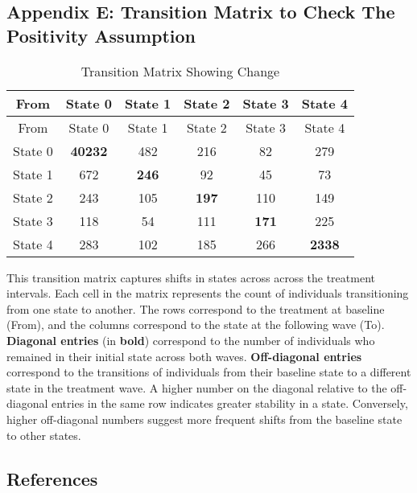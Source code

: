 \documentclass[
  single column]{article}
\begin{document}
\newpage{}

\subsection{Appendix E: Transition Matrix to Check The Positivity
Assumption}\label{appendix-transition}

\begin{longtable}[]{@{}cccccc@{}}
\caption{Transition Matrix Showing
Change}\label{tbl-transition}\tabularnewline
\toprule\noalign{}
From & State 0 & State 1 & State 2 & State 3 & State 4 \\
\midrule\noalign{}
\endfirsthead
\toprule\noalign{}
From & State 0 & State 1 & State 2 & State 3 & State 4 \\
\midrule\noalign{}
\endhead
\bottomrule\noalign{}
\endlastfoot
State 0 & \textbf{40232} & 482 & 216 & 82 & 279 \\
State 1 & 672 & \textbf{246} & 92 & 45 & 73 \\
State 2 & 243 & 105 & \textbf{197} & 110 & 149 \\
State 3 & 118 & 54 & 111 & \textbf{171} & 225 \\
State 4 & 283 & 102 & 185 & 266 & \textbf{2338} \\
\end{longtable}

This transition matrix captures shifts in states across across the
treatment intervals. Each cell in the matrix represents the count of
individuals transitioning from one state to another. The rows correspond
to the treatment at baseline (From), and the columns correspond to the
state at the following wave (To). \textbf{Diagonal entries} (in
\textbf{bold}) correspond to the number of individuals who remained in
their initial state across both waves. \textbf{Off-diagonal entries}
correspond to the transitions of individuals from their baseline state
to a different state in the treatment wave. A higher number on the
diagonal relative to the off-diagonal entries in the same row indicates
greater stability in a state. Conversely, higher off-diagonal numbers
suggest more frequent shifts from the baseline state to other states.

\newpage{}

\subsection*{References}\label{references}
\end{document}
